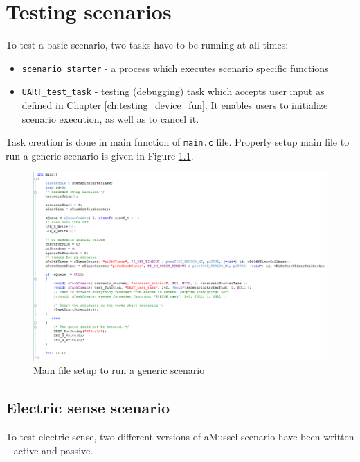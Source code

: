 \chapter{Testing scenarios}

To test a basic scenario, two tasks have to be running at all times:
\begin{itemize}
	\item \texttt{scenario\_starter} - a process which executes scenario specific functions
	\item \texttt{UART\_test\_task} - testing (debugging) task which accepts user input as defined in Chapter \ref{ch:testing_device_fun}. It enables users to initialize scenario execution, as well as to cancel it.
\end{itemize}

Task creation is done in main function of \texttt{main.c} file. Properly setup main file to run a generic scenario is given in Figure \ref{fig:main_c}.

\begin{figure}[htb]
    \centering
	  \includegraphics[width=\linewidth]{figures/Main_scenario.png}
	\caption{Main file setup to run a generic scenario}
	\label{fig:main_c}
\end{figure}

\section{Electric sense scenario}

To test electric sense, two different versions of aMussel scenario have been written -- active and passive. 

